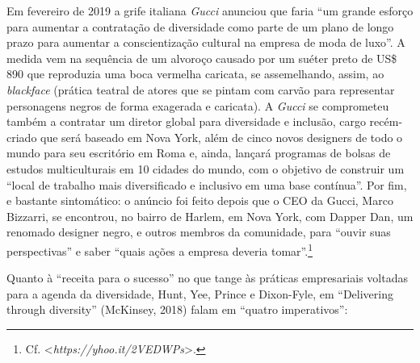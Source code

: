 Em fevereiro de 2019 a grife italiana \emph{Gucci} anunciou que faria
``um grande esforço para aumentar a contratação de diversidade como
parte de um plano de longo prazo para aumentar a conscientização
cultural na empresa de moda de luxo''. A medida vem na sequência de um
alvoroço causado por um suéter preto de US\$ 890 que reproduzia uma boca
vermelha caricata, se assemelhando, assim, ao \emph{blackface} (prática
teatral de atores que se pintam com carvão para representar personagens
negros de forma exagerada e caricata). A \emph{Gucci} se comprometeu
também a contratar um diretor global para diversidade e inclusão, cargo
recém-criado que será baseado em Nova York, além de cinco novos
designers de todo o mundo para seu escritório em Roma e, ainda, lançará
programas de bolsas de estudos multiculturais em 10 cidades do mundo,
com o objetivo de construir um ``local de trabalho mais diversificado e
inclusivo em uma base contínua''. Por fim, e bastante sintomático: o
anúncio foi feito depois que o CEO da Gucci, Marco Bizzarri, se
encontrou, no bairro de Harlem, em Nova York, com Dapper Dan, um
renomado designer negro, e outros membros da comunidade, para ``ouvir
suas perspectivas'' e saber ``quais ações a empresa deveria
tomar''.\footnote{Cf.
  \textless{}\emph{https://yhoo.it/2VEDWPs}\textgreater{}.}

Quanto à ``receita para o sucesso'' no que tange às práticas
empresariais voltadas para a agenda da diversidade, Hunt, Yee, Prince e
Dixon-Fyle, em ``Delivering through diversity'' (McKinsey, 2018) falam
em ``quatro imperativos'':

